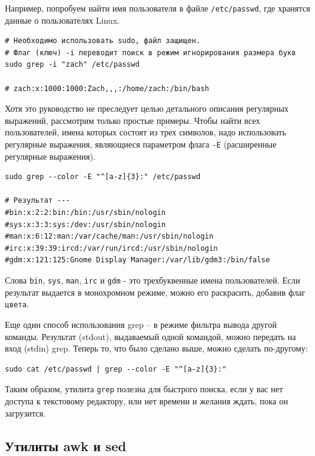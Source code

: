 \documentclass[a4paper,12pt,final,openany]{extbook}
\begin{document}
Например, попробуем найти имя пользователя в файле \texttt{/etc/passwd},
где хранятся данные о пользователях Linux.

\begin{verbatim}
# Необходимо использовать sudo, файл защищен.
# Флаг (ключ) -i переводит поиск в режим игнорирования размера букв
sudo grep -i "zach" /etc/passwd

# zach:x:1000:1000:Zach,,,:/home/zach:/bin/bash
\end{verbatim}

Хотя это руководство не преследует целью детального описания регулярных
выражений, рассмотрим только простые примеры. Чтобы найти всех
пользователей, имена которых состоят из трех символов, надо использовать регулярные выражения,
являющиеся параметром флага \texttt{-E} (расширенные регулярные выражения).

\begin{verbatim}
sudo grep --color -E "^[a-z]{3}:" /etc/passwd

# Результат ---
#bin:x:2:2:bin:/bin:/usr/sbin/nologin
#sys:x:3:3:sys:/dev:/usr/sbin/nologin
#man:x:6:12:man:/var/cache/man:/usr/sbin/nologin
#irc:x:39:39:ircd:/var/run/ircd:/usr/sbin/nologin
#gdm:x:121:125:Gnome Display Manager:/var/lib/gdm3:/bin/false
\end{verbatim}

Слова \texttt{bin}, \texttt{sys}, \texttt{man}, \texttt{irc} и \texttt{gdm} - это трехбуквенные имена пользователей. Если результат выдается в монохромном режиме, можно его раскрасить, добавив флаг \texttt{цвета}.

Еще один способ использования grep -- в режиме фильтра вывода другой
команды. Результат (stdout), выдаваемый одной командой, можно передать
на вход (stdin) grep. Теперь то, что было сделано выше, можно сделать
по-другому:

\begin{verbatim}
sudo cat /etc/passwd | grep --color -E "^[a-z]{3}:"
\end{verbatim}

Таким образом, утилита \texttt{grep} полезна для быстрого поиска, если у
вас нет доступа к текстовому редактору, или нет времени и
желания ждать, пока он загрузится.

\hypertarget{awk-and-sed}{%
\subsection{\texorpdfstring{\protect\hyperlink{awk-and-sed}{}Утилиты
awk и sed}{Утилиты awk и sed}}\label{awk-and-sed}}
\end{document}
